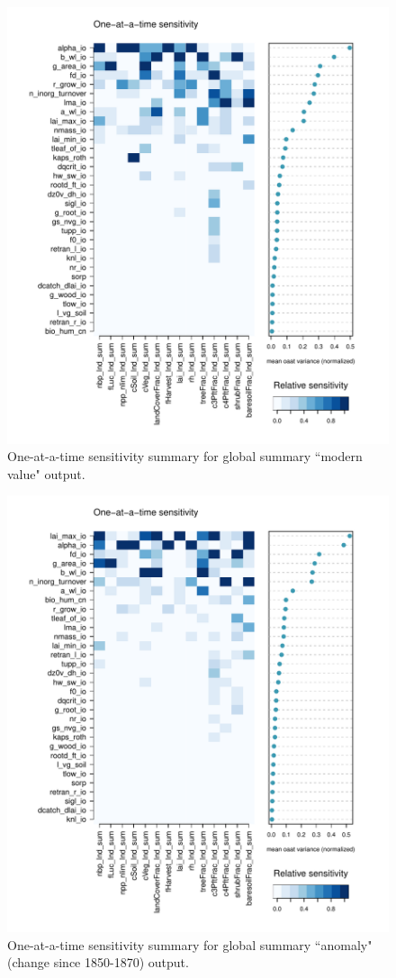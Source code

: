 \documentclass[gmd, manuscript]{copernicus}
\begin{document}
\begin{figure}[t]
\includegraphics[width=12cm]{./graphics/oat_var_sensmat_level1a_Y}
\caption{One-at-a-time sensitivity summary for global summary ``modern value" output.}
\label{fig:oat_var_sensmat_level1a_Y}
\end{figure}

\begin{figure}[t]
\includegraphics[width=12cm]{./graphics/oat_var_sensmat_level1a_YAnom}
\caption{One-at-a-time sensitivity summary for global summary ``anomaly" (change since 1850-1870) output.}
\label{fig:oat_var_sensmat_level1a_YAnom}
\end{figure}
\end{document}
